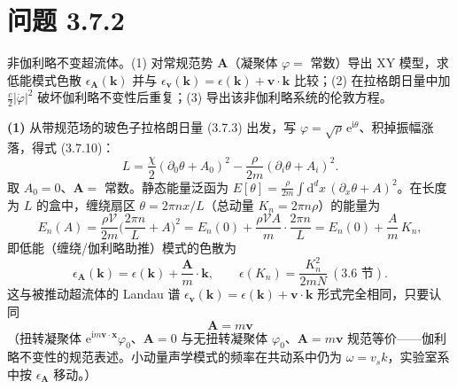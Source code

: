 \section*{问题 3.7.2}
\begin{problem}
非伽利略不变超流体。(1) 对常规范势 $\pmb{A}$（凝聚体 $\varphi=$ 常数）导出 XY 模型，求低能模式色散 $\epsilon_{\pmb{A}}(\pmb{k})$ 并与 $\epsilon_{\pmb{v}}(\pmb{k})=\epsilon(\pmb{k})+\pmb{v}\cdot\pmb{k}$ 比较；(2) 在拉格朗日量中加 $\frac{c}{2}|\dot\varphi|^{2}$ 破坏伽利略不变性后重复；(3) 导出该非伽利略系统的伦敦方程。
\end{problem}
\solution

\textbf{(1)} 从带规范场的玻色子拉格朗日量 (3.7.3) 出发，写 $\varphi=\sqrt{\rho}\,\mathrm{e}^{\mathrm{i}\theta}$、积掉振幅涨落，得式 (3.7.10)：
\begin{equation*}
L=\frac{\chi}{2}(\partial_0\theta+A_0)^{2}-\frac{\rho}{2m}(\partial_i\theta+A_i)^{2} .
\end{equation*}
取 $A_0=0$、$\pmb{A}=$ 常数。静态能量泛函为 $E[\theta]=\frac{\rho}{2m}\int\mathrm{d}^dx\,(\partial_x\theta+A)^{2}$。在长度为 $L$ 的盒中，缠绕扇区 $\theta=2\pi n x/L$（总动量 $K_n=2\pi n\rho$）的能量为
\begin{equation*}
E_n(A)=\frac{\rho\mathcal{V}}{2m}\Big(\frac{2\pi n}{L}+A\Big)^{2}
=E_n(0)+\frac{\rho\mathcal{V}A}{m}\cdot\frac{2\pi n}{L}
=E_n(0)+\frac{A}{m}\,K_n ,
\end{equation*}
即低能（缠绕/伽利略助推）模式的色散为
\begin{equation*}
\epsilon_{\pmb{A}}(\pmb{k})=\epsilon(\pmb{k})+\frac{\pmb{A}}{m}\cdot\pmb{k},
\qquad \epsilon(K_n)=\frac{K_n^{2}}{2mN}\ (\text{3.6 节}) .
\end{equation*}
这与被推动超流体的 Landau 谱 $\epsilon_{\pmb{v}}(\pmb{k})=\epsilon(\pmb{k})+\pmb{v}\cdot\pmb{k}$ 形式完全相同，只要认同
\begin{equation*}
\boxed{\;\pmb{A}=m\pmb{v}\;}
\end{equation*}
（扭转凝聚体 $\mathrm{e}^{\mathrm{i}m\pmb{v}\cdot\pmb{x}}\varphi_0$、$\pmb{A}=0$ 与无扭转凝聚体 $\varphi_0$、$\pmb{A}=m\pmb{v}$ 规范等价——伽利略不变性的规范表述。小动量声学模式的频率在共动系中仍为 $\omega=v_s k$，实验室系中按 $\epsilon_{\pmb{A}}$ 移动。）

